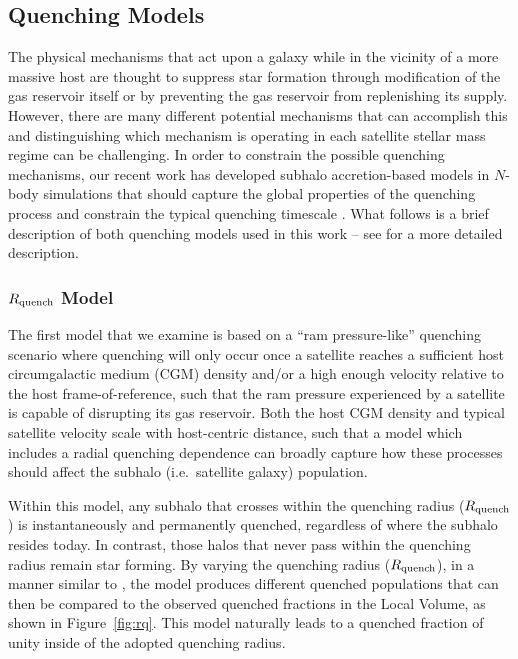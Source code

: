 \documentclass[usenatbib]{mnras}
\begin{document}



\subsection{Quenching Models}
\label{subsec:models}

The physical mechanisms that act upon a galaxy while in the vicinity
of a more massive host are thought to suppress star formation through
modification of the gas reservoir itself or by preventing the gas
reservoir from replenishing its supply. 
%
However, there are many different potential mechanisms that can
accomplish this and distinguishing which mechanism is operating in
each satellite stellar mass regime can be challenging.
%
In order to constrain the possible quenching mechanisms, our recent work has
developed subhalo accretion-based models in $N$-body simulations that
should capture the global properties of the quenching process
and constrain the typical quenching timescale \citep{fham15, wheeler14}.
%
What follows is a brief description of both quenching models used in
this work -- see \citet{fham15} for a more detailed description.
%



\subsubsection{$R_{\rm quench}$ Model}
\label{subsubsec:rps}

The first model that we examine is based on a ``ram pressure-like'' quenching
scenario where quenching will only occur once a satellite reaches a sufficient
host circumgalactic medium (CGM) density and/or a high enough velocity relative
to the host frame-of-reference, such that the ram pressure experienced by a
satellite is capable of disrupting its gas reservoir.
%
Both the host CGM density and typical satellite velocity scale with host-centric
distance, such that a model which includes a radial quenching dependence can
broadly capture how these processes should affect the subhalo (i.e.~satellite
galaxy) population.
%




Within this model, any subhalo that crosses within the quenching radius
($R_{\rm quench}$) is instantaneously and permanently quenched, regardless of
where the subhalo resides today.
%
In contrast, those halos that never pass within the quenching radius remain
star forming.
%
By varying the quenching radius ($R_{\rm quench}$), in a manner similar to
\citet{fham15}, the model produces different quenched populations that can then
be compared to the observed quenched fractions in the Local Volume, as shown in
Figure~\ref{fig:rq}.
%
This model naturally leads to a quenched fraction of unity inside of the adopted
quenching radius.
%
\end{document}
